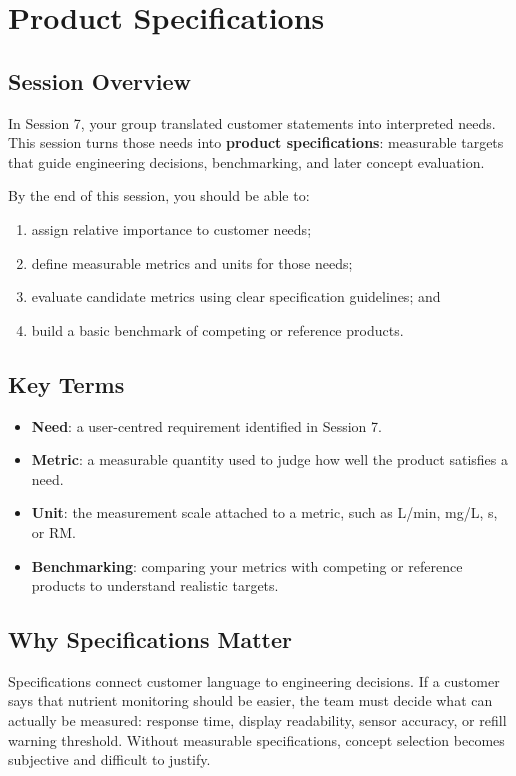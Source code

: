 \chapter{Product Specifications}

\section{Session Overview}

In Session 7, your group translated customer statements into interpreted needs. This session turns those needs into \textbf{product specifications}: measurable targets that guide engineering decisions, benchmarking, and later concept evaluation.

By the end of this session, you should be able to:
\begin{enumerate}
    \item assign relative importance to customer needs;
    \item define measurable metrics and units for those needs;
    \item evaluate candidate metrics using clear specification guidelines; and
    \item build a basic benchmark of competing or reference products.
\end{enumerate}

\section{Key Terms}

\begin{itemize}
    \item \textbf{Need}: a user-centred requirement identified in Session 7.
    \item \textbf{Metric}: a measurable quantity used to judge how well the product satisfies a need.
    \item \textbf{Unit}: the measurement scale attached to a metric, such as L/min, mg/L, s, or RM.
    \item \textbf{Benchmarking}: comparing your metrics with competing or reference products to understand realistic targets.
\end{itemize}

\section{Why Specifications Matter}

Specifications connect customer language to engineering decisions. If a customer says that nutrient monitoring should be easier, the team must decide what can actually be measured: response time, display readability, sensor accuracy, or refill warning threshold. Without measurable specifications, concept selection becomes subjective and difficult to justify.

